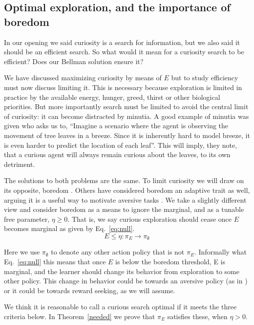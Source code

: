\subsection{Optimal exploration, and the importance of boredom}
In our opening we said curiosity is a search for information, but we also said it should be an efficient search. So what would it mean for a curiosity search  to be efficient? Does our Bellman solution ensure it?

We have discussed maximizing curiosity by means of $E$ but to study efficiency must now discuss limiting it. This is necessary because exploration is limited in practice by the available energy, hunger, greed, thirst or other biological priorities. But more importantly search must be limited to avoid the central limit of curiosity: it can become distracted by minutia. A good example of minutia was given \cite{Pathak2017} who asks us to, ``Imagine a scenario where the agent is observing the movement of tree leaves in a breeze. Since it is inherently hard to model breeze, it is even harder to predict the location of each leaf''. This will imply, they note, that a curious agent will always remain curious about the leaves, to its own detriment. 

The solutions to both problems are the same. To limit curiosity we will draw on its opposite, boredom \cite{Schmidhuber1991}. Others have considered boredom an adaptive trait as well, arguing it is a useful way to motivate aversive tasks \cite{Bench2013}. We take a slightly different view and consider boredom as a means to ignore the marginal, and as a tunable free parameter, $\eta \ge 0$. That is, we say curious exploration should cease once $E$ becomes marginal as given by Eq.~\ref{eq:null}. 
\begin{equation}
	\label{eq:null}
	E \le \eta : \pi_E \rightarrow \pi_{\emptyset}
\end{equation}

Here we use $\pi_{\emptyset}$ to denote any other action policy that is not $\pi_E$. Informally what Eq.~\ref{eq:null} this means that once $E$ is below the boredom threshold, E is marginal, and the learner should change its behavior from exploration to some other policy. This change in behavior could be towards an aversive policy (as in \cite{Bench2013}) or it could be towards reward seeking, as we will assume.

We think it is reasonable to call a curious search optimal if it meets the three criteria below. In Theorem~\ref{needed} we prove that $\pi_E$ satisfies these, when $\eta > 0$.


